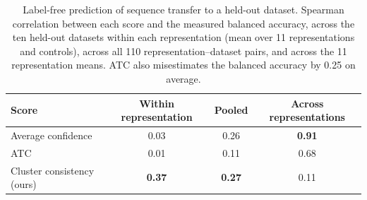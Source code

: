 \documentclass[11pt]{article}
\begin{document}
\begin{table}[H]
\centering
\small
\caption{Label-free prediction of sequence transfer to a held-out dataset.
Spearman correlation between each score and the measured balanced accuracy,
across the ten held-out datasets within each representation (mean over 11
representations and controls), across all 110 representation--dataset pairs,
and across the 11 representation means. ATC also misestimates the balanced
accuracy by 0.25 on average.}
\label{tab:failure}
\begin{tabular}{l c c c}
\toprule
\textbf{Score} & \textbf{Within representation} & \textbf{Pooled} & \textbf{Across representations} \\
\midrule
Average confidence~\cite{hendrycks_baseline_2017} & 0.03 & 0.26 & \textbf{0.91} \\
ATC~\cite{garg_leveraging_2022}                   & 0.01 & 0.11 & 0.68 \\
Cluster consistency (ours)                        & \textbf{0.37} & \textbf{0.27} & 0.11 \\
\bottomrule
\end{tabular}
\end{table}
\end{document}

